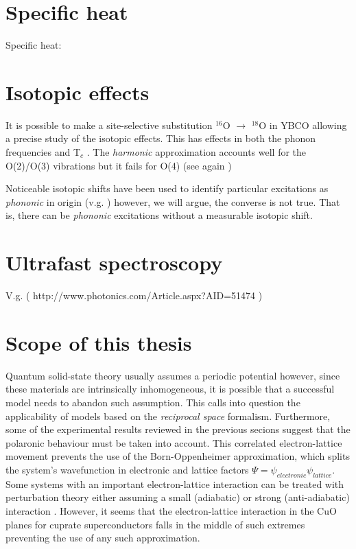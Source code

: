 \section{Specific heat}
\label{sec:specific_heat}

Specific heat: \cite{Loram1993}


\section{Isotopic effects}
\label{sec:isotopic_effects}

It is possible to make a site-selective substitution $^{16}$O $\rightarrow$ $^{18}$O in YBCO \cite{Conder1993} allowing a precise study of the isotopic effects. 
This has effects in both the phonon frequencies \cite{Ruani1994} and T$_{c}$ \cite{Zech1994,Cardona1988}. 
The \textit{harmonic} approximation accounts well for the O(2)/O(3) vibrations but it fails for O(4) (see again \cite{Ruani1994})

Noticeable isotopic shifts have been used to identify particular excitations as \textit{phononic} in origin (v.g. \cite{Thomsen1990}) however, we will argue, the converse is not true. 
That is, there can be \textit{phononic} excitations without a measurable isotopic shift.

\section{Ultrafast spectroscopy}
\label{sec:ultrafast_spect}

V.g. \cite{Basov2005} \cite{Smallwood2012} ( http://www.photonics.com/Article.aspx?AID=51474 )

\section{Scope of this thesis}
\label{sec:scope}


Quantum solid-state theory usually assumes a periodic potential however, since these materials are intrinsically inhomogeneous, it is possible that a successful model needs to abandon such assumption. 
This calls into question the applicability of models based on the \textit{reciprocal space} formalism.
Furthermore, some of the experimental results reviewed in the previous secions suggest that the polaronic behaviour must be taken into account.
This correlated electron-lattice movement prevents the use of the Born-Oppenheimer approximation, which splits the system's wavefunction in electronic and lattice factors $\Psi = \psi_{electronic}\psi_{lattice}$.
Some systems with an important electron-lattice interaction can be treated with perturbation theory either assuming a small (adiabatic) or strong (anti-adiabatic) interaction \cite{?}. 
However, it seems that the electron-lattice interaction in the CuO planes for cuprate superconductors falls in the middle of such extremes \cite{MustredeLeon1992} preventing the use of any such approximation.

